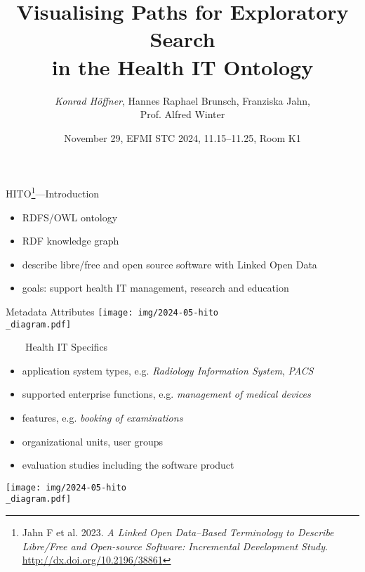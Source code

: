 \documentclass[aspectratio=1610,12pt]{beamer}
\author{\emph{Konrad Höffner}, Hannes Raphael Brunsch, Franziska Jahn,\\Prof. Alfred Winter}
\title{\large Visualising Paths for Exploratory Search\\in the Health IT Ontology}
\date{November 29, EFMI STC 2024, 11.15--11.25, Room K1}
\begin{document}
\begin{frame}
\titlepage
\end{frame}


\begin{frame}[plain]{HITO\footnote{Jahn F et al. 2023. \emph{A Linked Open Data–Based Terminology to Describe Libre/Free and Open-source Software: Incremental Development Study}. \url{http://dx.doi.org/10.2196/38861}}---Introduction}
\begin{itemize}
\item RDFS/OWL ontology
\item RDF knowledge graph
\item describe libre/free and open source software with Linked Open Data
\item goals: support health IT management, research and education
\end{itemize}

\end{frame}

{
\begin{frame}[plain]{Metadata Attributes}
\centering\texttt{[image: img/2024-05-hito\\\_diagram.pdf]}
\end{frame}
\restoregeometry
}

{
\begin{frame}{~~~~Health IT Specifics}
\begin{itemize}
\item application system types, e.g. \emph{Radiology Information System}, \emph{PACS}
\item supported enterprise functions, e.g. \emph{management of medical devices}
\item features, e.g. \emph{booking of examinations}
\item organizational units, user groups
\item evaluation studies including the software product
\end{itemize}
\centering\texttt{[image: img/2024-05-hito\\\_diagram.pdf]}
\end{frame}
\restoregeometry
}
\end{document}
